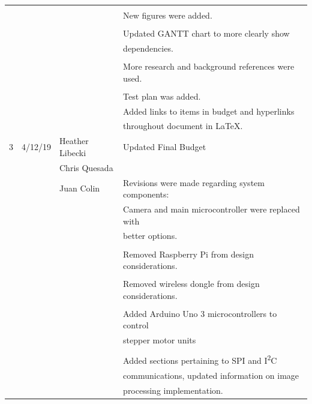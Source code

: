 \begin{table} [H]
\begin{tabular}{|l|l|l|l|}
	      &			 &				   &	\\
	      &			 & 				   & New figures were added.\\
	      &			 &				   &	\\
	      &			 &				   & Updated GANTT chart to more clearly show\\
	      &			 &				   & dependencies.\\
	      &			 &				   &	\\
	      &			 &				   & More research and background references were used.\\
	      &			 &				   &	\\
	      &			 &				   & Test plan was added.\\
 	      &			 &				   & Added links to items in budget and hyperlinks \\
 	      &          		 &                 			   & throughout document in LaTeX.\\
 	     	 \hline
 	   3 & 4/12/19  	 & Heather Libecki & Updated Final Budget \\ 
 	      &          		 & Chris Quesada  	 	   & 	\\
 	      &			 & Juan Colin     		   & Revisions were made regarding system components: \\ 
 	      &			 &                 			   & Camera and main microcontroller were replaced with \\
 	      &			 &				   & better options. 	\\
 	      &          		 &               			   & 	\\
 	      &          		 &              			   & Removed Raspberry Pi from design considerations. \\
 	      &         		 &               			   & 	\\
 	      &         		 &             			   & Removed wireless dongle from design considerations. \\
 	      &        		 &              			   & \\
 	      &         		 &            		              & Added Arduino Uno 3 microcontrollers to control \\
 	      &        		 &                			   & stepper motor units \\
 	      &         		 &              			   & \\
 	      &         		 &               			   & Added sections pertaining to SPI and I\textsuperscript{2}C \\
 	      &         		 &              			   & communications, updated information on image \\
 	      &        		 &                 			   &  processing implementation. \\
		\hline
\end{tabular} 
\end{table} 	
